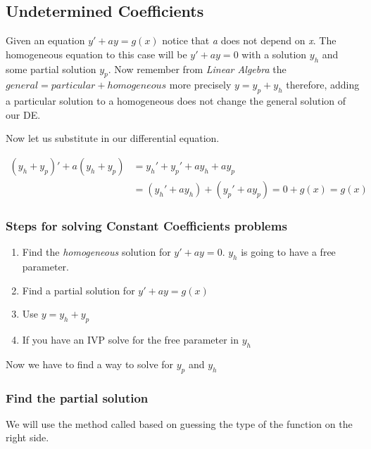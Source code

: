 \subsection{Undetermined Coefficients}

Given an equation \(y' + ay = g(x)\) notice that \emph{a} does not depend on \emph{x}.
The homogeneous equation to this case will be \(y' + ay = 0\) with a solution \(y_h\) and some
partial solution \(y_p\). Now remember from \emph{Linear Algebra} the 
\(general = particular + homogeneous\) more precisely \(y = y_p + y_h\) therefore, adding a 
particular solution to a homogeneous does not change
the general solution of our DE.
\vspace{\baselineskip}

Now let us substitute in our differential equation.

\begin{align*}
    (y_h + y_p)' + a(y_h + y_p) &= y_h' + y_p' + ay_h + ay_p\\   
    &= (y_h' + ay_h) + (y_p' + ay_p) = 0 + g(x) = g(x) 
\end{align*}

\subsubsection{Steps for solving Constant Coefficients problems}

\begin{enumerate}

    \item Find the \emph{homogeneous} solution for \(y' + ay = 0\). \(y_h\) is going
          to have a free parameter.
    
    \item Find a partial solution for \(y' + ay = g(x)\)
    
    \item Use \(y = y_h + y_p\)
    
    \item If you have an IVP solve for the free parameter in \(y_h\)

\end{enumerate}

Now we have to find a way to solve for \(y_p\) and \(y_h\)

\subsubsection{Find the partial solution}

We will use the method called based on guessing the type of the function on the right side.
\vspace{\baselineskip}

